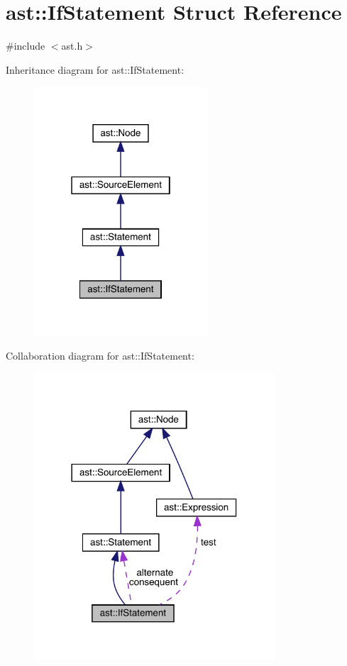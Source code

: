 \hypertarget{structast_1_1_if_statement}{}\section{ast\+:\+:If\+Statement Struct Reference}
\label{structast_1_1_if_statement}


{\ttfamily \#include $<$ast.\+h$>$}



Inheritance diagram for ast\+:\+:If\+Statement\+:
\nopagebreak
\begin{figure}[H]
\begin{center}
\leavevmode
\includegraphics[width=183pt]{structast_1_1_if_statement__inherit__graph}
\end{center}
\end{figure}


Collaboration diagram for ast\+:\+:If\+Statement\+:
\nopagebreak
\begin{figure}[H]
\begin{center}
\leavevmode
\includegraphics[width=254pt]{structast_1_1_if_statement__coll__graph}
\end{center}
\end{figure}
